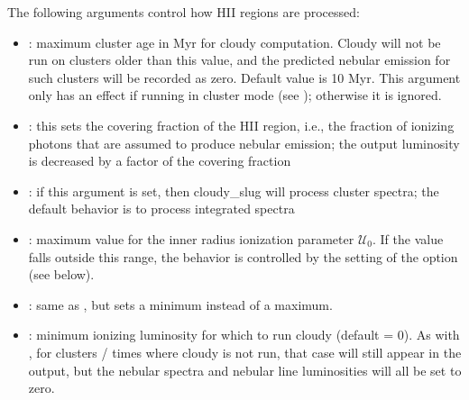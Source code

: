 \documentclass[letterpaper,10pt,english]{sphinxmanual}
\begin{document}
The following arguments control how HII regions are processed:
\begin{itemize}
\item {} 
: maximum cluster age in Myr for
cloudy computation. Cloudy will not be run on clusters older than
this value, and the predicted nebular emission for such clusters
will be recorded as zero. Default value is 10 Myr. This argument only
has an effect if running in cluster mode (see
{\hyperref[\detokenize{cloudy:sssec-cloudy-integrated-cluster}]{}}); otherwise it is ignored.

\item {} 
: this sets the
covering fraction of the HII region, i.e., the fraction of ionizing
photons that are assumed to produce nebular emission; the output
luminosity is decreased by a factor of the covering fraction

\item {} 
: if this argument is set, then cloudy\_slug
will process cluster spectra; the default behavior is to process
integrated spectra

\item {} 
: maximum value for the inner radius
ionization parameter \(\mathcal{U}_0\). If the value falls
outside this range, the behavior is controlled by the setting of the
 option (see below).

\item {} 
: same as , but sets a
minimum instead of a maximum.

\item {} 
: minimum ionizing luminosity for
which to run cloudy (default = 0). As with , for
clusters / times where cloudy is not run, that case will still
appear in the output, but the nebular spectra and nebular line
luminosities will all be set to zero.

\end{itemize}
\end{document}
